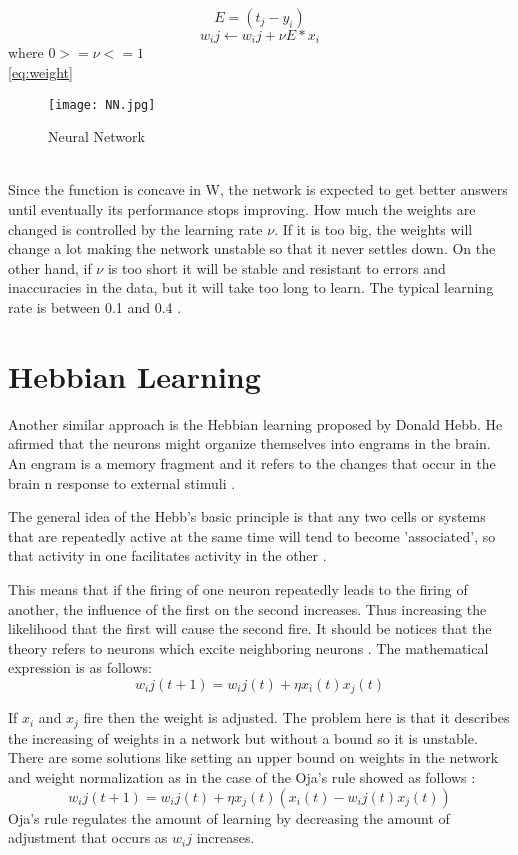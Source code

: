 \begin{equation}
\label{eq:error}
E=(t_j - y_i)
\end{equation}
\begin{equation}
\label{eq:weight}
w_ij \leftarrow w_ij+\nu E * x_i
\end{equation} where $0>=\nu<=1$ \\
\ref{eq:weight}
\begin{figure}
\label{fig:nn}
\center
\texttt{[image: NN.jpg]}
\caption{Neural Network}
\end{figure}
\\
Since the function is concave in W, the network is expected to get better answers until eventually its performance stops improving. How much the weights are changed is controlled by the learning rate $\nu$. If it is too big, the weights will change a lot  making the network unstable so that it never settles down. On the other hand, if $\nu$ is too short it will be stable and resistant to errors and inaccuracies in the data, but it will take too long to learn. The typical learning rate is between 0.1 and 0.4 \cite{marsland2015machine}.

\section{Hebbian Learning}
Another similar approach is the Hebbian learning proposed by Donald Hebb. He afirmed that the neurons might organize themselves into engrams in the brain. An engram is a memory fragment and it refers to the changes that occur in the brain n response to external stimuli \cite{strom2007hebbian}.

The general idea of the Hebb's basic principle is that any two cells or systems that are repeatedly active at the same time will tend to become 'associated', so that activity in one facilitates activity in the other \cite{morris1999hebb}.

This means that if the firing of one neuron repeatedly leads to the firing of another, the influence of the first on the second increases. Thus increasing the likelihood that the  first will cause the second fire.
It should be notices that the theory refers to neurons which excite neighboring neurons \cite{strom2007hebbian}.
The mathematical expression is as follows:
\begin{equation}
\label{eq:hebbianrule}
w_ij (t+1)= w_ij(t)+\eta x_i(t)x_j(t)
\end{equation}

If $x_i$ and $x_j$ fire then the weight is adjusted. The problem here is that it describes the increasing of weights in a network but without a bound so it is unstable. There are some solutions like setting an upper bound on weights in the network and weight normalization as in the case of the Oja's rule showed as follows \cite{oja1982simplified}:
\begin{equation}
\label{eq:ojasrule}
w_ij (t+1)= w_ij(t)+\eta x_j(t)(x_i(t) - w_ij(t)x_j(t))
\end{equation}
Oja's rule regulates the amount of learning by decreasing the amount of adjustment that occurs as $w_ij$ increases.

